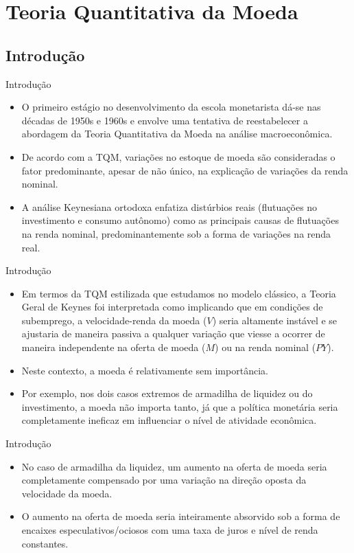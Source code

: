 \documentclass[10pt]{beamer}
\begin{document}
\section{Teoria Quantitativa da Moeda}
\subsection{Introdução}
\begin{frame}{Introdução}
    \begin{itemize}
        \item O primeiro estágio no desenvolvimento da escola monetarista dá-se nas décadas de 1950s e 1960s e envolve uma tentativa de reestabelecer a abordagem da Teoria Quantitativa da Moeda na análise macroeconômica.
        \bigskip
        \item De acordo com a TQM, variações no estoque de moeda são consideradas o fator predominante, apesar de não único, na explicação de variações da renda nominal.
        \bigskip
        \item A análise Keynesiana ortodoxa enfatiza distúrbios reais (flutuações no investimento e consumo autônomo) como as principais causas de flutuações na renda nominal, predominantemente sob a forma de variações na renda real.
    \end{itemize}
\end{frame}

\begin{frame}{Introdução}
    \begin{itemize}
        \item Em termos da TQM estilizada que estudamos no modelo clássico, a Teoria Geral de Keynes foi interpretada como implicando que em condições de subemprego, a velocidade-renda da moeda ($V$) seria altamente instável e se ajustaria de maneira passiva a qualquer variação que viesse a ocorrer de maneira independente na oferta de moeda ($M$) ou na renda nominal ($PY$).
        \bigskip
        \item Neste contexto, a moeda é relativamente sem importância.
        \bigskip
        \item Por exemplo, nos dois casos extremos de armadilha de liquidez ou do investimento, a moeda não importa tanto, já que a política monetária seria completamente ineficaz em influenciar o nível de atividade econômica.
    \end{itemize}
\end{frame}

\begin{frame}{Introdução}
    \begin{itemize}
        \item No caso de armadilha da liquidez, um aumento na oferta de moeda seria completamente compensado por uma variação na direção oposta da velocidade da moeda.
        \bigskip
        \item O aumento na oferta de moeda seria inteiramente absorvido sob a forma de encaixes especulativos/ociosos com uma taxa de juros e nível de renda constantes.
    \end{itemize}
\end{frame}
\end{document}
